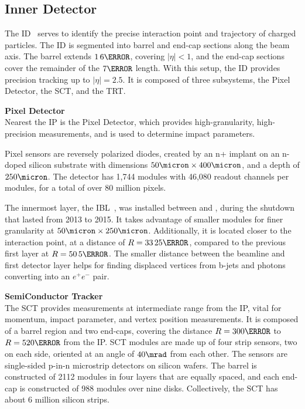 \subsection{Inner Detector}  \label{ssec:innerdetector}

The \gls{ID}~\cite{inner-detector-tdr} serves to identify the precise interaction point and trajectory of charged particles. The \gls{ID} is segmented into barrel and end-cap sections along the beam axis. The barrel extends $\unit{1.6}{\meter}$, covering $|\eta| < 1$, and the end-cap sections cover the remainder of the $\unit{7}{\meter}$ length. With this setup, the \gls{ID} provides precision tracking up to $|\eta| = 2.5$. It is composed of three subsystems, the Pixel Detector, the \gls{SCT}, and the \gls{TRT}.

\noindent\textbf{Pixel Detector}\\
\indent Nearest the \gls{IP} is the Pixel Detector, which provides high-granularity, high-precision measurements, and is used to determine impact parameters.

Pixel sensors are reversely polarized diodes, created by an n+ implant on an n-doped silicon substrate with dimensions $ \unit{50}{\micron} \times \unit{400}{\micron}$, and a depth of $\unit{250}{\micron}$. The detector has 1,744 modules with 46,080 readout channels per modules, for a total of over 80 million pixels.
    
The innermost layer, the \gls{IBL}~\cite{ibl-tdr}, was installed between \RunOne and \RunTwo, during the shutdown that lasted from 2013 to 2015. It takes advantage of smaller modules for finer granularity at $\unit{50}{\micron} \times \unit{250}{\micron}$. Additionally, it is located closer to the interaction point, at a distance of $R=\unit{33.25}{\mm}$, compared to the previous first layer at $R=\unit{50.5}{\mm}$. The smaller distance between the beamline and first detector layer helps for finding displaced vertices from b-jets and photons converting into an $e^+e^-$ pair.

\noindent\textbf{SemiConductor Tracker}\\
\indent The \gls{SCT} provides measurements at intermediate range from the \gls{IP}, vital for momentum, impact parameter, and vertex position measurements. It is composed of a barrel region and two end-caps, covering the distance $R=\unit{300}{\mm}$ to $R= \unit{520}{\mm}$ from the \gls{IP}. \gls{SCT} modules are made up of four strip sensors, two on each side, oriented at an angle of $\unit{40}{\mrad}$ from each other. The sensors are single-sided p-in-n microstrip detectors on silicon wafers. The barrel is constructed of 2112 modules in four layers that are equally spaced, and each end-cap is constructed of 988 modules over nine disks. Collectively, the \gls{SCT} has about 6 million silicon strips.

